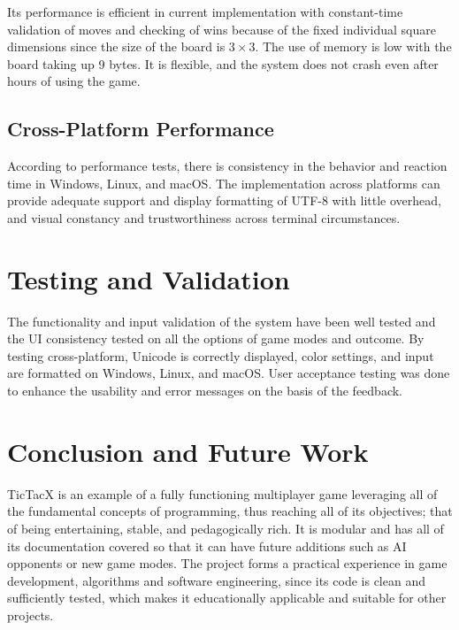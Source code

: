 \documentclass[11pt,a4paper,twocolumn]{article}
\begin{document}
Its performance is efficient in current implementation with constant-time validation of moves and checking of wins because of the fixed individual square dimensions since the size of the board is $3 \times 3$. The use of memory is low with the board taking up 9 bytes. It is flexible, and the system does not crash even after hours of using the game.

\subsection{Cross-Platform Performance}

According to performance tests, there is consistency in the behavior and reaction time in Windows, Linux, and macOS. The implementation across platforms can provide adequate support and display formatting of UTF-8 with little overhead, and visual constancy and trustworthiness across terminal circumstances.

\section{Testing and Validation}

The functionality and input validation of the system have been well tested and the UI consistency tested on all the options of game modes and outcome. By testing cross-platform, Unicode is correctly displayed, color settings, and input are formatted on Windows, Linux, and macOS. User acceptance testing was done to enhance the usability and error messages on the basis of the feedback.

\section{Conclusion and Future Work}

TicTacX is an example of a fully functioning multiplayer game leveraging all of the fundamental concepts of programming, thus reaching all of its objectives; that of being entertaining, stable, and pedagogically rich. It is modular and has all of its documentation covered so that it can have future additions such as AI opponents or new game modes. The project forms a practical experience in game development, algorithms and software engineering, since its code is clean and sufficiently tested, which makes it educationally applicable and suitable for other projects.

\end{document}
